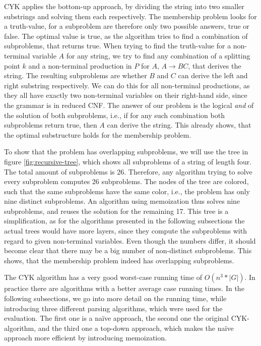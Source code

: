 CYK applies the bottom-up approach, by dividing the string into two smaller substrings and solving them each respectively.
The membership problem looks for a truth-value, for a subproblem are therefore only two possible answers, true or false.
The optimal value is true, as the algorithm tries to find a combination of subproblems, that returns true.
When trying to find the truth-value for a non-terminal variable $A$ for any string, we try to find any combination of a splitting point $k$ and a non-terminal production in $P$ for $A$, $A\rightarrow BC$, that derives the string.
The resulting subproblems are whether $B$ and $C$ can derive the left and right substring respectively.
We can do this for all non-terminal productions, as they all have exactly two non-terminal variables on their right-hand side, since the grammar is in reduced CNF.
The answer of our problem is the logical \textit{and} of the solution of both subproblems, i.e., if for any such combination both subproblems return true, then $A$ can derive the string.
This already shows, that the optimal substructure holds for the membership problem.



To show that the problem has overlapping subproblems, we will use the tree in figure \ref{fig:recursive-tree}, which shows all subproblems of a string of length four.
The total amount of subproblems is 26.
Therefore, any algorithm trying to solve every subproblem computes 26 subproblems.
The nodes of the tree are colored, such that the same subproblems have the same color, i.e., the problem has only nine distinct subproblems.
An algorithm using memoization thus solves nine subproblems, and reuses the solution for the remaining 17.
This tree is a simplification, as for the algorithms presented in the following subsections the actual trees would have more layers, since they compute the subproblems with regard to given non-terminal variables.
Even though the numbers differ, it should become clear that there may be a big number of non-distinct subproblems.
This shows, that the membership problem indeed has overlapping subproblems.

The CYK algorithm has a very good worst-case running time of $O(n^3 * |G|)$.
In practice there are algorithms with a better average case running times.
In the following subsections, we go into more detail on the running time, while introducing three different parsing algorithms, which were used for the evaluation.
The first one is a na\"{i}ve approach, the second one the original CYK-algorithm, and the third one a top-down approach, which makes the na\"{i}ve approach more efficient by introducing memoization.

